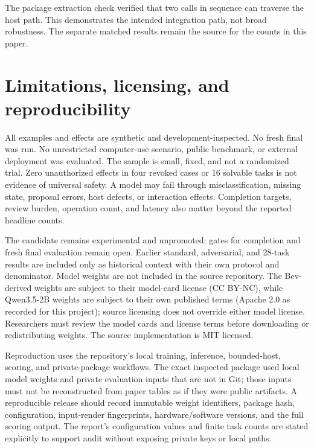 \documentclass[11pt]{article}
\begin{document}
The package extraction check verified that two calls in sequence can traverse the host path. This demonstrates the intended integration path, not broad robustness. The separate matched results remain the source for the counts in this paper.

\section{Limitations, licensing, and reproducibility}
All examples and effects are synthetic and development-inspected. No fresh final was run. No unrestricted computer-use scenario, public benchmark, or external deployment was evaluated. The sample is small, fixed, and not a randomized trial. Zero unauthorized effects in four revoked cases or 16 solvable tasks is not evidence of universal safety. A model may fail through misclassification, missing state, proposal errors, host defects, or interaction effects. Completion targets, review burden, operation count, and latency also matter beyond the reported headline counts.

The candidate remains experimental and unpromoted; gates for completion and fresh final evaluation remain open. Earlier standard, adversarial, and 28-task results are included only as historical context with their own protocol and denominator. Model weights are not included in the source repository. The Bev-derived weights are subject to their model-card license (CC BY-NC), while Qwen3.5-2B weights are subject to their own published terms (Apache 2.0 as recorded for this project); source licensing does not override either model license. Researchers must review the model cards and license terms before downloading or redistributing weights. The source implementation is MIT licensed.

Reproduction uses the repository's local training, inference, bounded-host, scoring, and private-package workflows. The exact inspected package used local model weights and private evaluation inputs that are not in Git; those inputs must not be reconstructed from paper tables as if they were public artifacts. A reproducible release should record immutable weight identifiers, package hash, configuration, input-render fingerprints, hardware/software versions, and the full scoring output. The report's configuration values and finite task counts are stated explicitly to support audit without exposing private keys or local paths.
\end{document}
